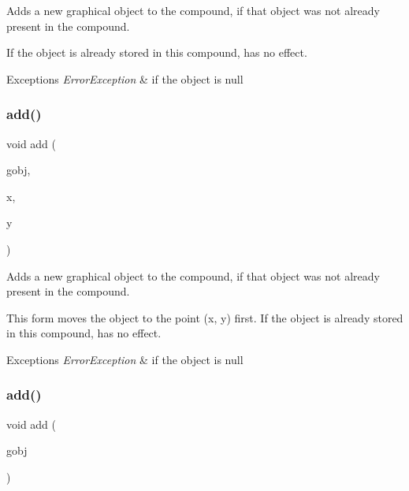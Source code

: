 Adds a new graphical object to the compound, if that object was not already present in the compound. 

If the object is already stored in this compound, has no effect. 
\begin{DoxyExceptions}{Exceptions}
{\em Error\+Exception} & if the object is null \\
\hline
\end{DoxyExceptions}
\mbox{\label{classsgl_1_1GCompound_a8bb36f245efc7806414a1339c2befa1c}} 
\subsubsection{\texorpdfstring{add()}{add()}\hspace{0.1cm}{\footnotesize\ttfamily [2/4]}}
{\footnotesize\ttfamily void add (\begin{DoxyParamCaption}\item[{\mbox{\hyperlink{classsgl_1_1GObject}{G\+Object}} $\ast$}]{gobj,  }\item[{double}]{x,  }\item[{double}]{y }\end{DoxyParamCaption})\hspace{0.3cm}{\ttfamily [virtual]}}



Adds a new graphical object to the compound, if that object was not already present in the compound. 

This form moves the object to the point ({\ttfamily x}, {\ttfamily y}) first. If the object is already stored in this compound, has no effect. 
\begin{DoxyExceptions}{Exceptions}
{\em Error\+Exception} & if the object is null \\
\hline
\end{DoxyExceptions}
\mbox{\label{classsgl_1_1GCompound_ac732fc2123d7a6d7e2de145fe9bbd8e8}} 
\subsubsection{\texorpdfstring{add()}{add()}\hspace{0.1cm}{\footnotesize\ttfamily [3/4]}}
{\footnotesize\ttfamily void add (\begin{DoxyParamCaption}\item[{\mbox{\hyperlink{classsgl_1_1GObject}{G\+Object}} \&}]{gobj }\end{DoxyParamCaption})\hspace{0.3cm}{\ttfamily [virtual]}}



